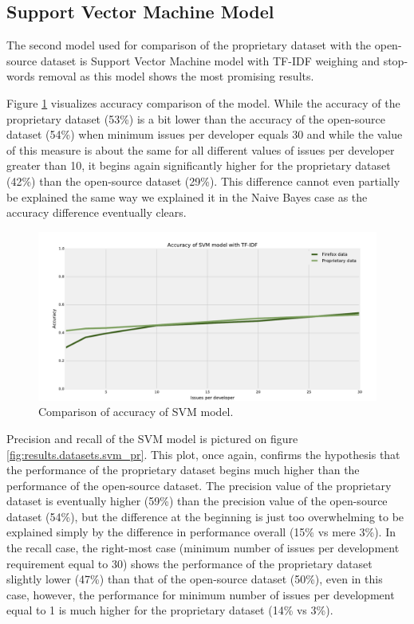 \subsection{Support Vector Machine Model}

The second model used for comparison of the proprietary dataset with the open-source dataset is Support Vector Machine model with TF-IDF weighing and stop-words removal as this model shows the most promising results.

Figure \ref{fig:results.datasets.svm_accuracy} visualizes accuracy comparison of the model. While the accuracy of the proprietary dataset (53\%) is a bit lower than the accuracy of the open-source dataset (54\%) when minimum issues per developer equals 30 and while the value of this measure is about the same for all different values of issues per developer greater than 10, it begins again significantly higher for the proprietary dataset (42\%) than the open-source dataset (29\%). This difference cannot even partially be explained the same way we explained it in the Naive Bayes case as the accuracy difference eventually clears.

\begin{figure}[htbp]
    \centering
        \includegraphics[width=\textwidth]{./images/prop_vs_os/svm_accuracy.pdf}
    \caption{Comparison of accuracy of SVM model.}
    \label{fig:results.datasets.svm_accuracy}
\end{figure}

Precision and recall of the SVM model is pictured on figure \ref{fig:results.datasets.svm_pr}. This plot, once again, confirms the hypothesis that the performance of the proprietary dataset begins much higher than the performance of the open-source dataset. The precision value of the proprietary dataset is eventually higher (59\%) than the precision value of the open-source dataset (54\%), but the difference at the beginning is just too overwhelming to be explained simply by the difference in performance overall (15\% vs mere 3\%). In the recall case, the right-most case (minimum number of issues per development requirement equal to 30) shows the performance of the proprietary dataset slightly lower (47\%) than that of the open-source dataset (50\%), even in this case, however, the performance for minimum number of issues per development equal to 1 is much higher for the proprietary dataset (14\% vs 3\%).

